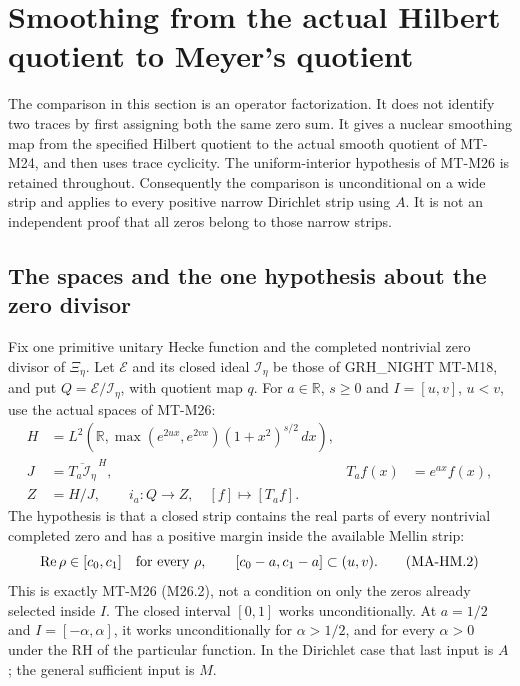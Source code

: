 \section{Smoothing from the actual Hilbert quotient to Meyer's quotient}
\label{sec:hilbert-meyer-bridge}

The comparison in this section is an operator factorization.  It does
not identify two traces by first assigning both the same zero sum.
It gives a nuclear smoothing map from the specified Hilbert quotient
to the actual smooth quotient of MT-M24, and then uses trace cyclicity.
The uniform-interior hypothesis of MT-M26 is retained throughout.
Consequently the comparison is unconditional on a wide strip and
applies to every positive narrow Dirichlet strip using $A$.  It is
not an independent proof that all zeros belong to those narrow strips.

\subsection{The spaces and the one hypothesis about the zero divisor}

Fix one primitive unitary Hecke function and the completed nontrivial
zero divisor of $\Xi_\eta$.  Let $\mathcal E$ and its closed ideal
$\mathcal I_\eta$ be those of GRH\_NIGHT MT-M18, and put
$Q=\mathcal E/\mathcal I_\eta$, with quotient map $q$.
For $a\in\mathbb R$, $s\ge0$ and $I=[u,v]$, $u<v$, use the actual
spaces of MT-M26:
\[
 \begin{aligned}
 H&=L^2\!\left(\mathbb R,
     \max(e^{2ux},e^{2vx})(1+x^2)^{s/2}\,dx\right),\\
 J&=\overline{T_a\mathcal I_\eta}^{\,H},
       &T_af(x)&=e^{ax}f(x),\\
 Z&=H/J,\qquad
       i_a:Q\longrightarrow Z,\quad [f]\longmapsto[T_af].
 \end{aligned}
 \tag{MA-HM.1}
\]
The hypothesis is that a closed strip contains the real parts of
every nontrivial completed zero and has a positive margin inside
the available Mellin strip:
\[
       \operatorname{Re}\rho\in[c_0,c_1]\quad\hbox{for every }\rho,
       \qquad [c_0-a,c_1-a]\subset(u,v).
 \tag{MA-HM.2}
\]
This is exactly MT-M26 (M26.2), not a condition on only the zeros
already selected inside $I$.  The closed interval $[0,1]$ works
unconditionally.  At $a=1/2$ and $I=[-\alpha,\alpha]$, it works
unconditionally for $\alpha>1/2$, and for every $\alpha>0$ under
the RH of the particular function.  In the Dirichlet case that
last input is $A$; the general sufficient input is $M$.

